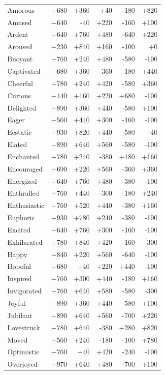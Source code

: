 \begin{longtable}{@{}p{}rrrrr}
Amorous & +680 & +360 & +40 & -180 & +820 \\
Amused & +640 & -40 & +220 & -160 & +100 \\
Ardent & +640 & +760 & +480 & -640 & +220 \\
Aroused & +230 & +840 & +160 & -100 & +0 \\
Buoyant & +760 & +240 & +480 & -580 & -100 \\
Captivated & +680 & +360 & -360 & -180 & +440 \\
Cheerful & +780 & +240 & +420 & -580 & +360 \\
Curious & +440 & +160 & +220 & +680 & -100 \\
Delighted & +890 & +360 & +440 & -580 & +100 \\
Eager & +560 & +440 & +300 & -160 & -100 \\
Ecstatic & +930 & +820 & +440 & -580 & -40 \\
Elated & +890 & +640 & +560 & -580 & -100 \\
Enchanted & +780 & +240 & -380 & +480 & +160 \\
Encouraged & +690 & +220 & +560 & -360 & +360 \\
Energized & +640 & +760 & +480 & -380 & -100 \\
Enthralled & +760 & +440 & -300 & -180 & +240 \\
Enthusiastic & +760 & +520 & +440 & -380 & +160 \\
Euphoric & +930 & +780 & +240 & -380 & -100 \\
Excited & +640 & +760 & +300 & -160 & -100 \\
Exhilarated & +780 & +840 & +420 & -160 & -300 \\
Happy & +840 & +220 & +560 & -640 & -100 \\
Hopeful & +680 & +40 & +220 & +440 & -100 \\
Inspired & +760 & +300 & +440 & -180 & +160 \\
Invigorated & +760 & +640 & +580 & -580 & -300 \\
Joyful & +890 & +360 & +440 & -580 & +100 \\
Jubilant & +890 & +640 & +560 & -700 & +220 \\
Lovestruck & +780 & +640 & -380 & +280 & +820 \\
Moved & +560 & +240 & -180 & -100 & +780 \\
Optimistic & +760 & +40 & +420 & -240 & -100 \\
Overjoyed & +970 & +640 & +480 & -700 & +100 \\

\end{longtable}
